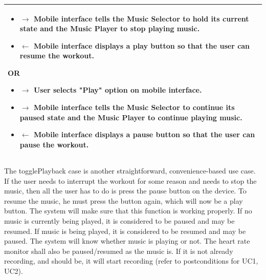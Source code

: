\documentclass[letterpaper,english, 12pt]{scrreprt}
\begin{document}
\begin{center}
\begin{tabular}{|C{15cm}|}
\begin{itemize}
					\item $\rightarrow$ Mobile interface tells the Music Selector to hold its current state and the Music Player to stop playing music.
                                        \item $\leftarrow$ Mobile interface displays a play button so that the user can resume the workout.
                                \end{itemize}
				OR
				\begin{itemize}
					\item $\rightarrow$ User selects "Play" option on mobile interface.
					\item $\rightarrow$ Mobile interface tells the Music Selector to continue its paused state and the Music Player to continue playing music.
					\item $\leftarrow$ Mobile interface displays a pause button so that the user can pause the workout.
				\end{itemize}
                \\
				\hline
        \end{tabular}
\end{center}

The togglePlayback case is another straightforward, convenience-based use case. If the user needs to interrupt the workout for some reason and needs to stop the music, then all the user has to do is press the pause button on the device. To resume the music, he must press the button again, which will now be a play button. The system will make sure that this function is working properly. If no music is currently being played, it is considered to be paused and may be resumed. If music is being played, it is considered to be resumed and may be paused. The system will know whether music is playing or not. The heart rate monitor shall also be paused/resumed as the music is. If it is not already recording, and should be, it will start recording (refer to postconditions for UC1, UC2). \pagebreak
\end{document}
